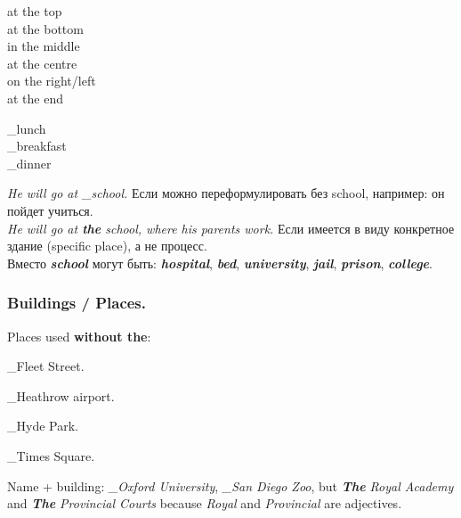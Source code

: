 \documentclass[10pt,a4paper]{article}
\newcommand\ex[1]{\textit{\textbf{{#1}}}}           %
\newcommand\za{\_\thinspace }                       %
\begin{document}
\begin{multicols}{3}
at the top\\
at the bottom\\
in the middle\\
at the centre\\
on the right/left\\
at the end
\end{multicols}

\begin{multicols}{3}
\za lunch\\
\za breakfast\\
\za dinner
\end{multicols}

\textit{He will go at \za school.} Если можно переформулировать без school, например: он пойдет учиться.\\
\textit{He will go at \textbf{the} school, where his parents work.} Если имеется в виду конкретное здание (specific place), а не процесс.\\
Вместо \ex{school} могут быть: \ex{hospital}, \ex{bed}, \ex{university}, \ex{jail}, \ex{prison}, \ex{college}.



\subsubsection{Buildings / Places.}
Places used \textbf{without the}:
\begin{description}[leftmargin=2.9cm,style=nextline,before={\renewcommand\makelabel[1]{##1:}}]
  \item[Streets, roads] \za Fleet Street.
  \item[Airports] \za Heathrow airport.
  \item[Parks] \za Hyde Park.
  \item[Squares] \za Times Square.
\end{description}
\vspace{-\parskip}
Name + building: \textit{\za Oxford University}, \textit{\za San Diego Zoo}, but \textit{\ex{The} Royal Academy} and \textit{\ex{The} Provincial Courts} because \textit{Royal} and \textit{Provincial} are adjectives.
\end{document}
